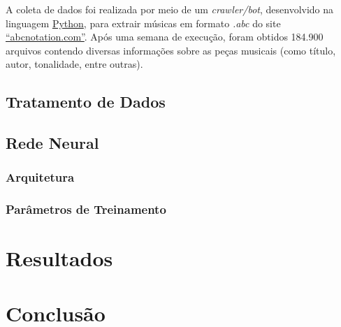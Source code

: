 \documentclass{automatextcc}
\begin{document}

A coleta de dados foi realizada por meio de um \textit{crawler/bot}, desenvolvido na linguagem \href{https://python.org/}{Python}, para extrair músicas em formato \textit{.abc} do site \href{https://abcnotation.com/}{``abcnotation.com''}. Após uma semana de execução, foram obtidos 184.900 arquivos contendo diversas informações sobre as peças musicais (como título, autor, tonalidade, entre outras).

\section{Tratamento de Dados}


\section{Rede Neural}
\subsection{Arquitetura}
\subsection{Parâmetros de Treinamento}

\chapter{Resultados}

\chapter{Conclusão}





\end{document}
